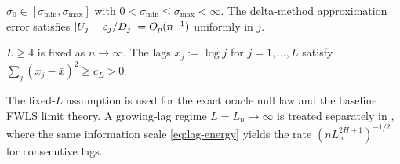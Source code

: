 \begin{assumption}
\label{ass:sigma}
$\sigma_0 \in [\sigma_{\min}, \sigma_{\max}]$ with
$0 < \sigma_{\min} \leq \sigma_{\max} < \infty$.
The delta-method approximation error satisfies
$\lvert U_j - \varepsilon_j/D_j\rvert = O_p(n^{-1})$ uniformly in $j$.
\end{assumption}

\begin{assumption}
\label{ass:lags}
$L \geq 4$ is fixed as $n \to \infty$.
The lags $x_j := \log j$ for $j = 1, \ldots, L$ satisfy
$\sum_j (x_j - \bar{x})^2 \geq c_L > 0$.
\end{assumption}

\begin{remark}
    The fixed-$L$ assumption is used for the exact oracle null law and the
    baseline FWLS limit theory.  A growing-lag regime $L=L_n \to \infty$ is
    treated separately in , where the same information
    scale \eqref{eq:lag-energy} yields the rate
    $(nL_n^{2H+1})^{-1/2}$ for consecutive lags.
\end{remark}
